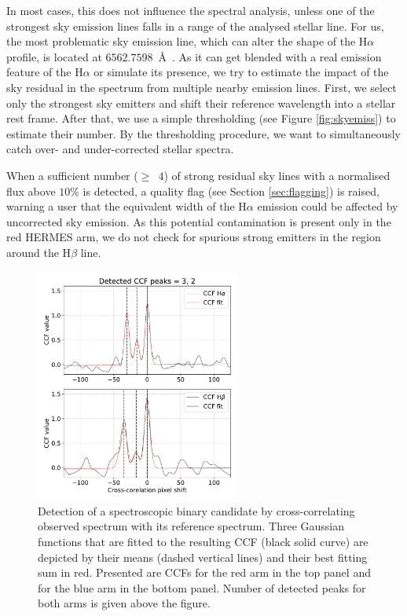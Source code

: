 In most cases, this does not influence the spectral analysis, unless one of the strongest sky emission lines falls in a range of the analysed stellar line. For us, the most problematic sky emission line, which can alter the shape of the H$\alpha$ profile, is located at $6562.7598$~\AA\ \citep[our list of sky emission lines was taken from][]{2003A&A...407.1157H}. As it can get blended with a real emission feature of the H$\alpha$ or simulate its presence, we try to estimate the impact of the sky residual in the spectrum from multiple nearby emission lines. First, we select only the strongest sky emitters \citep[with parameter \texttt{Flux}~$\ge$~$0.9$ in][]{2003A&A...407.1157H} and shift their reference wavelength into a stellar rest frame. After that, we use a simple thresholding (see Figure \ref{fig:skyemiss}) to estimate their number. By the thresholding procedure, we want to simultaneously catch over- and under-corrected stellar spectra.

When a sufficient number ($\ge$~$4$) of strong residual sky lines with a normalised flux above $10$\% is detected, a quality flag (see Section \ref{sec:flagging}) is raised, warning a user that the equivalent width of the H$\alpha$ emission could be affected by uncorrected sky emission. As this potential contamination is present only in the red HERMES arm, we do not check for spurious strong emitters in the region around the H$\beta$ line.

\begin{figure}
	\centering
	\includegraphics[width=0.6\textwidth]{paper_140812003801021_3.pdf}
	\caption{Detection of a spectroscopic binary candidate by cross-correlating observed spectrum with its reference spectrum. Three Gaussian functions that are fitted to the resulting CCF (black solid curve) are depicted by their means (dashed vertical lines) and their best fitting sum in red. Presented are CCFs for the red arm in the top panel and for the blue arm in the bottom panel. Number of detected peaks for both arms is given above the figure.}
	\label{fig:sb2ccf}
\end{figure}

